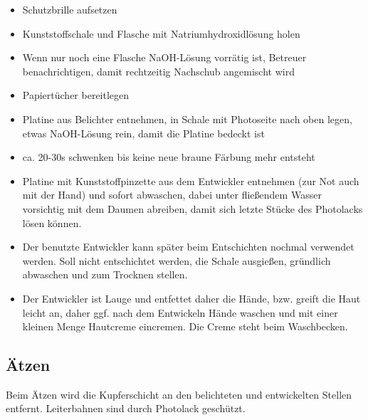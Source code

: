 \documentclass{\basedir/fablab-document}
\begin{document}
\begin{itemize}
\item Schutzbrille aufsetzen
\item Kunststoffschale und Flasche mit Natriumhydroxidlösung holen
\item Wenn nur noch eine Flasche NaOH-Lösung vorrätig ist, Betreuer benachrichtigen, damit rechtzeitig Nachschub angemischt wird
\item Papiertücher bereitlegen
\item Platine aus Belichter entnehmen, in Schale mit Photoseite nach oben legen, etwas NaOH-Lösung rein, damit die Platine bedeckt ist
\item ca. 20-30s schwenken bis keine neue braune Färbung mehr entsteht
\item Platine mit Kunststoffpinzette aus dem Entwickler entnehmen (zur Not auch mit der Hand) und sofort abwaschen, dabei unter fließendem Wasser vorsichtig mit dem Daumen abreiben, damit sich letzte Stücke des Photolacks lösen können.
\item Der benutzte Entwickler kann später beim Entschichten nochmal verwendet werden. Soll nicht entschichtet werden, die Schale ausgießen, gründlich abwaschen und zum Trocknen stellen.
\item Der Entwickler ist Lauge und entfettet daher die Hände, bzw. greift die Haut leicht an, daher ggf. nach dem Entwickeln Hände waschen und mit einer kleinen Menge Hautcreme eincremen. Die Creme steht beim Waschbecken.
\end{itemize}

\subsection{Ätzen}
\label{sec:aetzen}
Beim Ätzen wird die Kupferschicht an den belichteten und entwickelten Stellen entfernt. Leiterbahnen sind durch Photolack geschützt.
\end{document}
